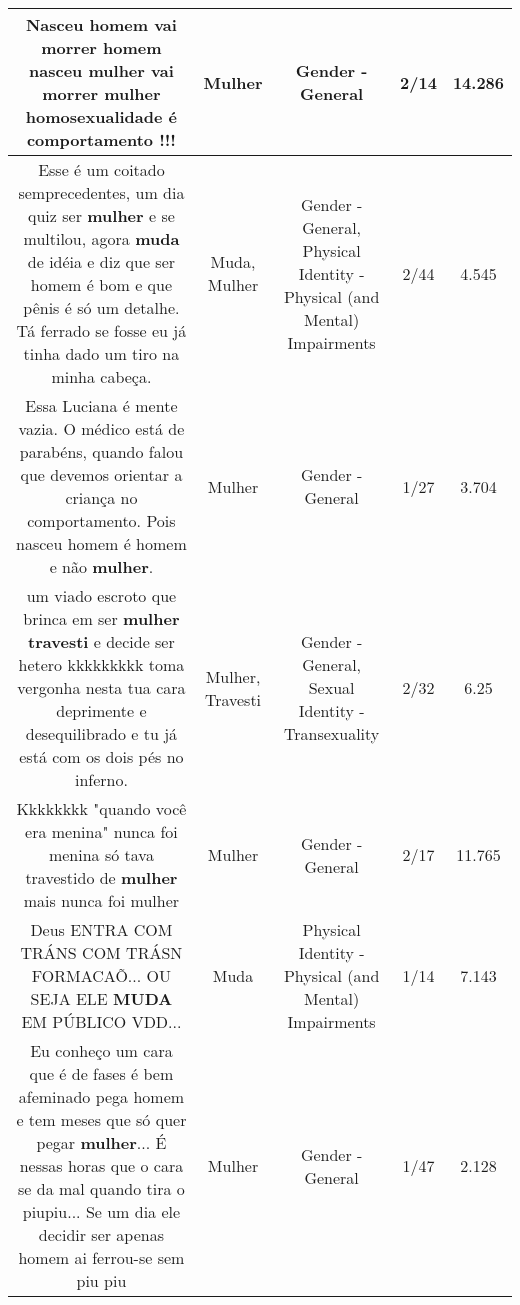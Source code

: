 \documentclass[11pt]{article}
\newlength\mylength
\begin{document}
\begin{center}
\begin{longtable}{|C{.65\mylength}|C{.30\mylength}|C{.12\mylength}|C{.12\mylength}|C{.12\mylength}|}
  \small Nasceu homem vai morrer homem nasceu \textbf{mulher} vai morrer \textbf{mulher} homosexualidade é comportamento !!!\normalsize   & Mulher & Gender - General & 2/14 & 14.286 \\  \hline
  \small Esse é um coitado semprecedentes, um dia quiz ser \textbf{mulher} e se multilou, agora \textbf{muda} de idéia e diz que ser homem é bom e que pênis é só um detalhe. Tá ferrado se fosse eu já tinha dado um tiro na minha cabeça.\normalsize   & Muda, Mulher & Gender - General, Physical Identity - Physical (and Mental) Impairments & 2/44 & 4.545 \\  \hline
  \small Essa Luciana é mente vazia. O médico está de parabéns,  quando falou que devemos orientar a criança no comportamento. Pois nasceu homem é homem e não \textbf{mulher}.\normalsize   & Mulher & Gender - General & 1/27 & 3.704 \\  \hline
  \small um viado escroto que brinca em ser \textbf{mulher} \textbf{travesti} e decide ser hetero kkkkkkkkk toma vergonha nesta tua cara deprimente e desequilibrado e tu já está com os dois pés no inferno.\normalsize   & Mulher, Travesti & Gender - General, Sexual Identity - Transexuality & 2/32 & 6.25 \\  \hline
  \small Kkkkkkkk "quando você era menina" nunca foi menina só tava travestido de \textbf{mulher} mais nunca foi mulher\normalsize   & Mulher & Gender - General & 2/17 & 11.765 \\  \hline
  \small Deus ENTRA COM TRÁNS COM TRÁSN FORMACAÕ... OU SEJA  ELE \textbf{MUDA} EM PÚBLICO VDD...\normalsize   & Muda & Physical Identity - Physical (and Mental) Impairments & 1/14 & 7.143 \\  \hline
  \small Eu conheço um cara que é de fases é bem afeminado pega homem e tem meses que só quer  pegar \textbf{mulher}... É nessas horas que o cara se da mal quando tira o piupiu... Se um dia ele decidir ser apenas homem ai ferrou-se sem piu piu\normalsize   & Mulher & Gender - General & 1/47 & 2.128 \\  \hline

\end{longtable}
\end{center}
\end{document}
